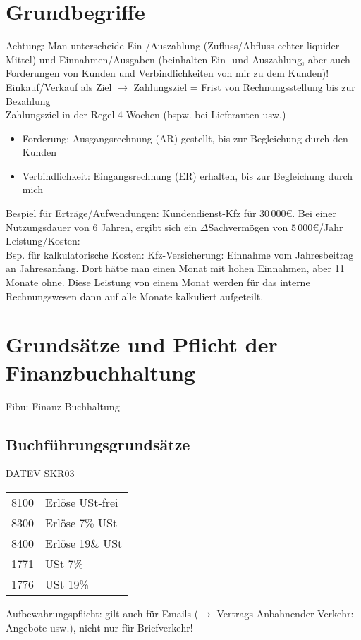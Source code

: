 \section{Grundbegriffe}
Achtung: Man unterscheide Ein-/Auszahlung (Zufluss/Abfluss echter liquider Mittel) und Einnahmen/Ausgaben (beinhalten Ein- und Auszahlung, aber auch Forderungen von Kunden und Verbindlichkeiten von mir zu dem Kunden)!\medskip\\
Einkauf/Verkauf als Ziel $\to$ Zahlungsziel = Frist von Rechnungsstellung bis zur Bezahlung\\
Zahlungsziel in der Regel 4 Wochen (bspw. bei Lieferanten usw.)
\begin{itemize}
\item Forderung: Ausgangsrechnung (AR) gestellt, bis zur Begleichung durch den Kunden
\item Verbindlichkeit: Eingangsrechnung (ER) erhalten, bis zur Begleichung durch mich
\end{itemize}
Bespiel für Erträge/Aufwendungen: Kundendienst-Kfz für $30\,000$\euro{}. Bei einer Nutzungsdauer von 6 Jahren, ergibt sich ein $\Delta$Sachvermögen von $5\,000$\euro{}/Jahr\bigskip\\
Leistung/Kosten: \\
Bsp. für kalkulatorische Kosten: Kfz-Versicherung: Einnahme vom Jahresbeitrag an Jahresanfang. Dort hätte man einen Monat mit hohen Einnahmen, aber 11 Monate ohne. Diese Leistung von einem Monat werden für das interne Rechnungswesen dann auf alle Monate kalkuliert aufgeteilt.
\section{Grundsätze und Pflicht der Finanzbuchhaltung}
Fibu: Finanz Buchhaltung
\subsection{Buchführungsgrundsätze}
DATEV SKR03\\
\begin{tabular}{l l}
8100 & Erlöse USt-frei\\
8300 & Erlöse 7\% USt\\
8400 & Erlöse 19\& USt\\
\hline
1771 & USt 7\%\\
1776 & USt 19\%
\end{tabular}
Aufbewahrungspflicht: gilt auch für Emails ($\to$ Vertrags-Anbahnender Verkehr: Angebote usw.), nicht nur für Briefverkehr!


